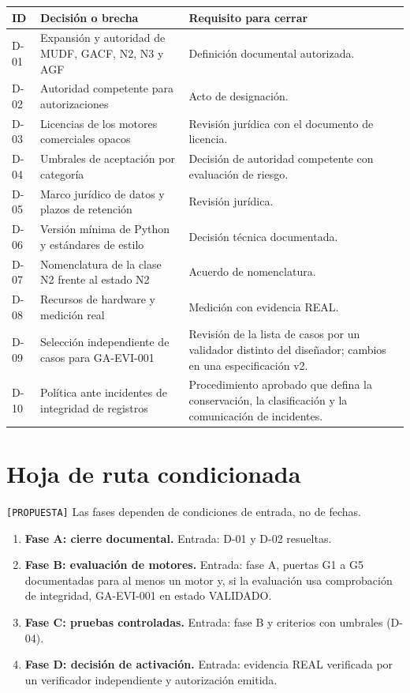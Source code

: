 \documentclass[12pt]{article}
\begin{document}
\begin{longtable}{|p{1.3cm}|p{6.4cm}|p{5.6cm}|}
\hline
\textbf{ID} & \textbf{Decisión o brecha} & \textbf{Requisito para cerrar} \\
\hline
\endhead
D-01 & Expansión y autoridad de MUDF, GACF, N2, N3 y AGF & Definición documental autorizada. \\
\hline
D-02 & Autoridad competente para autorizaciones & Acto de designación. \\
\hline
D-03 & Licencias de los motores comerciales opacos & Revisión jurídica con el documento de licencia. \\
\hline
D-04 & Umbrales de aceptación por categoría & Decisión de autoridad competente con evaluación de riesgo. \\
\hline
D-05 & Marco jurídico de datos y plazos de retención & Revisión jurídica. \\
\hline
D-06 & Versión mínima de Python y estándares de estilo & Decisión técnica documentada. \\
\hline
D-07 & Nomenclatura de la clase N2 frente al estado N2 & Acuerdo de nomenclatura. \\
\hline
D-08 & Recursos de hardware y medición real & Medición con evidencia REAL. \\
\hline
D-09 & Selección independiente de casos para GA-EVI-001 & Revisión de la lista de casos por un validador distinto del diseñador; cambios en una especificación v2. \\
\hline
D-10 & Política ante incidentes de integridad de registros & Procedimiento aprobado que defina la conservación, la clasificación y la comunicación de incidentes. \\
\hline
\end{longtable}

\section{Hoja de ruta condicionada}

\texttt{[PROPUESTA]} Las fases dependen de condiciones de entrada, no de fechas.

\begin{enumerate}
    \item \textbf{Fase A: cierre documental.} Entrada: D-01 y D-02 resueltas.
    \item \textbf{Fase B: evaluación de motores.} Entrada: fase A, puertas G1 a G5 documentadas para al menos un motor y, si la evaluación usa comprobación de integridad, GA-EVI-001 en estado VALIDADO.
    \item \textbf{Fase C: pruebas controladas.} Entrada: fase B y criterios con umbrales (D-04).
    \item \textbf{Fase D: decisión de activación.} Entrada: evidencia REAL verificada por un verificador independiente y autorización emitida.
\end{enumerate}
\end{document}
